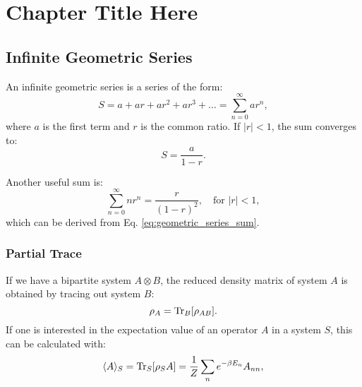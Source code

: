 
\chapter{Chapter Title Here} %

\label{Chapter_calc_extra_stuff} %


\section{Infinite Geometric Series}
An infinite geometric series is a series of the form:
\begin{equation} \label{eq:infinite_geometric_series}
S = a + ar + ar^2 + ar^3 + \dots = \sum_{n=0}^{\infty} ar^n,
\end{equation}
where \(a\) is the first term and \(r\) is the common ratio. If \(|r| < 1\), the sum converges to:
\begin{equation} \label{eq:geometric_series_sum}
S = \frac{a}{1 - r}.
\end{equation}

Another useful sum is:
\begin{equation} \label{eq:useful_sum}
\sum_{n=0}^{\infty} n r^n = \frac{r}{(1-r)^2}, \quad \text{for } |r| < 1,
\end{equation}
which can be derived from Eq. \eqref{eq:geometric_series_sum}.


\subsection{Partial Trace}
If we have a bipartite system \( A \otimes B \), the reduced density matrix of system \( A \) is obtained by tracing out system \( B \):
\begin{equation} \label{eq:partial_trace}
\rho_A = \mathrm{Tr}_B[\rho_{AB}].
\end{equation}
If one is interested in the expectation value of an operator \( A \) in a system \( S \), this can be calculated with:
\begin{equation} \label{eq:expectation_value}
\langle A \rangle_S = \mathrm{Tr}_S[\rho_S A] = \frac{1}{Z} \sum_n e^{-\beta E_n} A_{nn},
\end{equation}

